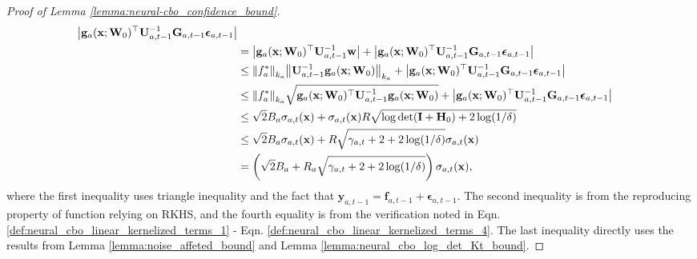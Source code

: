 \begin{proof}[Proof of Lemma \ref{lemma:neural-cbo_confidence_bound}]
\begin{align*}
        \left \lvert  \mathbf{g}_a(\mathbf{x}; \mathbf{W}_0)^\top \mathbf{U}^{-1}_{a,t-1} \mathbf{G}_{a,t-1} \boldsymbol{\epsilon}_{a, t-1}  \right \rvert 
        \\
        & = \left\lvert  \mathbf{g}_a(\mathbf{x}; \mathbf{W}_0)^\top \mathbf{U}^{-1}_{a,t-1} \mathbf{w}  \right\rvert  + \left\lvert \mathbf{g}_a(\mathbf{x}; \mathbf{W}_0)^\top \mathbf{U}^{-1}_{a,t-1} \mathbf{G}_{a,t-1} \boldsymbol{\epsilon}_{a, t-1}   \right\rvert 
        \\
        & \leq \norm{f_a^*}_{k_a}  \norm{   \mathbf{U}^{-1}_{a,t-1} \mathbf{g}_a(\mathbf{x}; \mathbf{W}_0)}_{k_a} + \left\lvert \mathbf{g}_a(\mathbf{x}; \mathbf{W}_0)^\top \mathbf{U}^{-1}_{a,t-1} \mathbf{G}_{a,t-1} \boldsymbol{\epsilon}_{a, t-1}   \right\rvert \\
        & \leq  \norm{f_a^*}_{k_a}  \sqrt { \mathbf{g}_a(\mathbf{x}; \mathbf{W}_0)^\top \mathbf{U}^{-1}_{a,t-1} \mathbf{g}_a(\mathbf{x}; \mathbf{W}_0)}  + \left\lvert \mathbf{g}_a(\mathbf{x}; \mathbf{W}_0)^\top \mathbf{U}^{-1}_{a,t-1} \mathbf{G}_{a,t-1} \boldsymbol{\epsilon}_{a, t-1}   \right\rvert 
        \\
        & \leq \sqrt{2}B_a \sigma_{a,t}(\mathbf{x}) + \sigma_{a,t}(\mathbf{x}) R \sqrt{\log \det (\mathbf{I} + \mathbf{H}_0) + 2 \log(1/\delta)} 
        \\
        & \le \sqrt{2}B_a \sigma_{a,t}(\mathbf{x}) +  R \sqrt{\gamma_{a,t} + 2 + 2 \log(1/\delta)} \sigma_{a,t}(\mathbf{x}) 
        \\
        & = \left(\sqrt{2}B_a + R_a \sqrt{\gamma_{a,t} + 2 + 2 \log(1/\delta)}\right)\sigma_{a,t}(\mathbf{x}),
\end{align*}
where the first inequality uses triangle inequality and the fact that $\mathbf{y}_{a,t-1}= \mathbf{f}_{a, t-1} + \boldsymbol{\epsilon}_{a, t-1}$. The second inequality is from the reproducing property of function relying on RKHS, and the fourth equality is from the verification noted in Eqn.  \eqref{def:neural_cbo_linear_kernelized_terms_1} - Eqn.  \eqref{def:neural_cbo_linear_kernelized_terms_4}. The last inequality directly uses the results from Lemma \ref{lemma:noise_affeted_bound} and Lemma  \ref{lemma:neural_cbo_log_det_Kt_bound}.


\end{proof}
